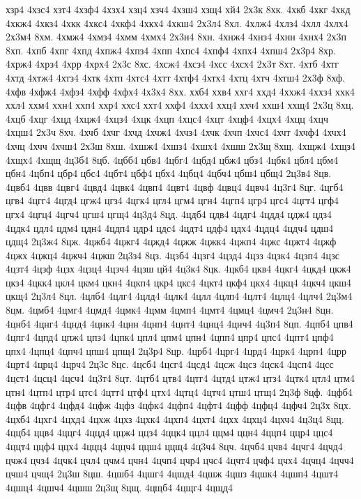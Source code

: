 {хзр4
4хзс4
хзт4
4хзф4
4хзх4
хзц4
хзч4
4хзш4
хзщ4
хй4
2х3к
8хк.
4хкб
4хкг
4хкд
4хкж4
4хкз4
4хкк
4хкс4
4хкф4
4хкх4
4хкш4
2х3л4
8хл.
4хлж4
4хлз4
4хлл
4хлх4
2х3м4
8хм.
4хмж4
4хмз4
4хмм
4хмх4
2х3н4
8хн.
4хнж4
4хнз4
4хнн
4хнх4
2х3п
8хп.
4хпб
4хпг
4хпд
4хпж4
4хпз4
4хпп
4хпс4
4хпф4
4хпх4
4хпш4
2х3р4
8хр.
4хрж4
4хрз4
4хрр
4хрх4
2х3с
8хс.
4хсж4
4хсз4
4хсс
4хсх4
2х3т
8хт.
4хтб
4хтг
4хтд
4хтж4
4хтз4
4хтк
4хтп
4хтс4
4хтт
4хтф4
4хтх4
4хтц
4хтч
4хтш4
2х3ф
8хф.
4хфв
4хфж4
4хфз4
4хфф
4хфх4
4х3х4
8хх.
ххб4
ххв4
ххг4
ххд4
4ххж4
4ххз4
ххк4
ххл4
ххм4
ххн4
ххп4
ххр4
ххс4
ххт4
ххф4
4ххх4
ххц4
ххч4
ххш4
ххщ4
2х3ц
8хц.
4хцб
4хцг
4хцд
4хцж4
4хцз4
4хцк
4хцп
4хцс4
4хцт
4хцф4
4хцх4
4хцц
4хцч
4хцш4
2х3ч
8хч.
4хчб
4хчг
4хчд
4хчж4
4хчз4
4хчк
4хчп
4хчс4
4хчт
4хчф4
4хчх4
4хчц
4хчч
4хчш4
2х3ш
8хш.
4хшж4
4хшз4
4хшх4
4хшш
2х3щ
8хщ.
4хщж4
4хщз4
4хщх4
4хщщ
4ц3б4
8цб.
4цбб4
цбв4
4цбг4
4цбд4
цбж4
цбз4
4цбк4
цбл4
цбм4
цбн4
4цбп4
цбр4
цбс4
4цбт4
цбф4
цбх4
4цбц4
4цбч4
цбш4
цбщ4
2ц3в4
8цв.
4цвб4
4цвв
4цвг4
4цвд4
4цвк4
4цвп4
4цвт4
4цвф
4цвц4
4цвч4
4ц3г4
8цг.
4цгб4
цгв4
4цгг4
4цгд4
цгж4
цгз4
4цгк4
цгл4
цгм4
цгн4
4цгп4
цгр4
цгс4
4цгт4
цгф4
цгх4
4цгц4
4цгч4
цгш4
цгщ4
4ц3д4
8цд.
4цдб4
цдв4
4цдг4
4цдд4
цдж4
цдз4
4цдк4
цдл4
цдм4
цдн4
4цдп4
цдр4
цдс4
4цдт4
цдф4
цдх4
4цдц4
4цдч4
цдш4
цдщ4
2ц3ж4
8цж.
4цжб4
4цжг4
4цжд4
4цжж
4цжк4
4цжп4
4цжс
4цжт4
4цжф
4цжх
4цжц4
4цжч4
4цжш
2ц3з4
8цз.
4цзб4
4цзг4
4цзд4
4цзз
4цзк4
4цзп4
4цзс
4цзт4
4цзф
4цзх
4цзц4
4цзч4
4цзш
цй4
4ц3к4
8цк.
4цкб4
цкв4
4цкг4
4цкд4
цкж4
цкз4
4цкк4
цкл4
цкм4
цкн4
4цкп4
цкр4
цкс4
4цкт4
цкф4
цкх4
4цкц4
4цкч4
цкш4
цкщ4
2ц3л4
8цл.
4цлб4
4цлг4
4цлд4
4цлк4
4цлл
4цлп4
4цлт4
4цлц4
4цлч4
2ц3м4
8цм.
4цмб4
4цмг4
4цмд4
4цмк4
4цмм
4цмп4
4цмт4
4цмц4
4цмч4
2ц3н4
8цн.
4цнб4
4цнг4
4цнд4
4цнк4
4цнн
4цнп4
4цнт4
4цнц4
4цнч4
4ц3п4
8цп.
4цпб4
цпв4
4цпг4
4цпд4
цпж4
цпз4
4цпк4
цпл4
цпм4
цпн4
4цпп4
цпр4
цпс4
4цпт4
цпф4
цпх4
4цпц4
4цпч4
цпш4
цпщ4
2ц3р4
8цр.
4црб4
4црг4
4црд4
4црк4
4црп4
4црр
4црт4
4црц4
4црч4
2ц3с
8цс.
4цсб4
4цсг4
4цсд4
4цсж
4цсз
4цск4
4цсп4
4цсс
4цст4
4цсц4
4цсч4
4ц3т4
8цт.
4цтб4
цтв4
4цтг4
4цтд4
цтж4
цтз4
4цтк4
цтл4
цтм4
цтн4
4цтп4
цтр4
цтс4
4цтт4
цтф4
цтх4
4цтц4
4цтч4
цтш4
цтщ4
2ц3ф
8цф.
4цфб4
4цфв
4цфг4
4цфд4
4цфж
4цфз
4цфк4
4цфп4
4цфт4
4цфф
4цфц4
4цфч4
2ц3х
8цх.
4цхб4
4цхг4
4цхд4
4цхж
4цхз
4цхк4
4цхп4
4цхт4
4цхх
4цхц4
4цхч4
4ц3ц4
8цц.
4ццб4
ццв4
4ццг4
4ццд4
ццж4
ццз4
4ццк4
ццл4
ццм4
ццн4
4ццп4
ццр4
ццс4
4ццт4
ццф4
ццх4
4ццц4
4ццч4
ццш4
ццщ4
4ц3ч4
8цч.
4цчб4
цчв4
4цчг4
4цчд4
цчж4
цчз4
4цчк4
цчл4
цчм4
цчн4
4цчп4
цчр4
цчс4
4цчт4
цчф4
цчх4
4цчц4
4цчч4
цчш4
цчщ4
2ц3ш
8цш.
4цшб4
4цшг4
4цшд4
4цшж
4цшз
4цшк4
4цшп4
4цшт4
4цшц4
4цшч4
4цшш
2ц3щ
8цщ.
4цщб4
4цщг4
4цщд4
}
